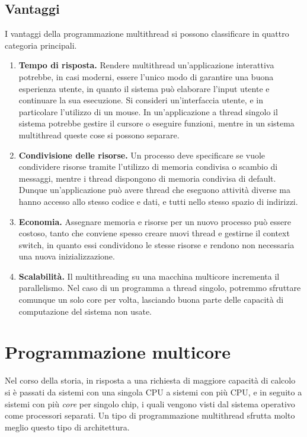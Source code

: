     \subsection{Vantaggi}
        I vantaggi della programmazione multithread si possono classificare in quattro categoria principali.
        \begin{enumerate}
            \item \textbf{Tempo di risposta.} Rendere multithread un'applicazione interattiva potrebbe, in casi moderni, essere l'unico modo di garantire una buona esperienza utente, in quanto il sistema può elaborare l'input utente e continuare la sua esecuzione. Si consideri un'interfaccia utente, e in particolare l'utilizzo di un mouse. In un'applicazione a thread singolo il sistema potrebbe gestire il cursore o eseguire funzioni, mentre in un sistema multithread queste cose si possono separare.
            
            \item \textbf{Condivisione delle risorse.} Un processo deve specificare se vuole condividere risorse tramite l'utilizzo di memoria condivisa o scambio di messaggi, mentre i thread dispongono di memoria condivisa di default. Dunque un'applicazione può avere thread che eseguono attività diverse ma hanno accesso allo stesso codice e dati, e tutti nello stesso spazio di indirizzi.
            
            \item \textbf{Economia.} Assegnare memoria e risorse per un nuovo processo può essere costoso, tanto che conviene spesso creare nuovi thread e gestirne il context switch, in quanto essi condividono le stesse risorse e rendono non necessaria una nuova inizializzazione.
            
            \item \textbf{Scalabilità.} Il multithreading su una macchina multicore incrementa il parallelismo. Nel caso di un programma a thread singolo, potremmo sfruttare comunque un solo core per volta, lasciando buona parte delle capacità di computazione del sistema non usate.
        \end{enumerate}
        
\section{Programmazione multicore}
    Nel corso della storia, in risposta a una richiesta di maggiore capacità di calcolo si è passati da sistemi con una singola CPU a sistemi con più CPU, e in seguito a sistemi con più \textit{core} per singolo chip, i quali vengono visti dal sistema operativo come processori separati. Un tipo di programmazione multithread sfrutta molto meglio questo tipo di architettura.
    
